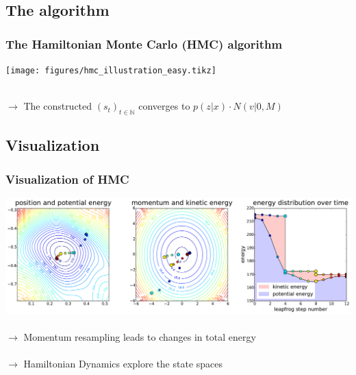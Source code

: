 \documentclass{beamer}
\begin{document}
	
	\subsection{The algorithm} 
	\begin{frame}
		\frametitle{The Hamiltonian Monte Carlo (HMC) algorithm}
		\centering		
		\texttt{[image: figures/hmc\_illustration\_easy.tikz]} %
		\\~\\
		\raggedright
		$\boldsymbol{\rightarrow}$ The constructed $(s_t)_{t \in \mathbb{N}}$ converges to $p(z|x) \cdot N(v|0, M)$ %
	\end{frame}	

	\subsection{Visualization} 
	\begin{frame}
		\frametitle{Visualization of HMC}
		\includegraphics[width=\textwidth]{figures/hmc_motion_3hmc_04lf_presi.pdf}
		\\~\\
		$\boldsymbol{\rightarrow}$ Momentum resampling leads to changes in total energy\\~\\
		$\boldsymbol{\rightarrow}$ Hamiltonian Dynamics explore the state spaces
	\end{frame}
	

\end{document}
